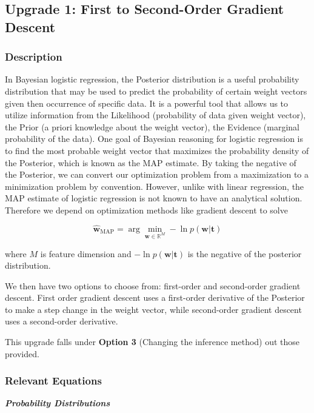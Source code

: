 \documentclass[12pt]{extarticle}
\begin{document}
\subsection{Upgrade 1: First to Second-Order Gradient Descent}

\subsubsection{Description}
In Bayesian logistic regression, the Posterior distribution is a useful probability distribution that may be used to predict the probability of certain weight vectors given then occurrence of specific data. It is a powerful tool that allows us to utilize information from the Likelihood (probability of data given weight vector), the Prior (a priori knowledge about the weight vector), the Evidence (marginal probability of the data). One goal of Bayesian reasoning for logistic regression is to find the most probable weight vector that maximizes the probability density of the Posterior, which is known as the MAP estimate. By taking the negative of the Posterior, we can convert our optimization problem from a maximization to a minimization problem by convention. However, unlike with linear regression, the MAP estimate of logistic regression is not known to have an analytical solution. Therefore we depend on optimization methods like gradient descent to solve

\begin{equation}
\hat{\textbf{w}}_{\mathrm{MAP}} = \arg\min_{\textbf{w} \in \mathbb{R}^M} -\ln p(\textbf{w}|\textbf{t}) 
\end{equation}

where $M$ is feature dimension and $-\ln p(\textbf{w}|\textbf{t})$ is the negative of the posterior distribution.

We then have two options to choose from: first-order and second-order gradient descent. First order gradient descent uses a first-order derivative of the Posterior to make a step change in the weight vector, while second-order gradient descent uses a second-order derivative.

This upgrade falls under \textbf{Option 3} (Changing the inference method) out those provided.

\subsubsection{Relevant Equations}

\textbf{\textit{Probability Distributions}}
\end{document}
